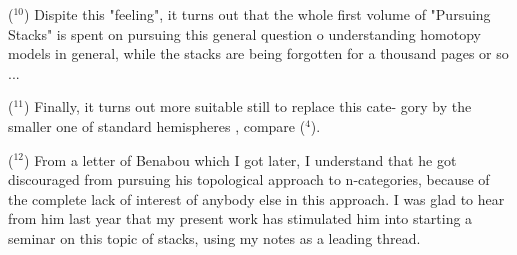 ($^{10}$)   Dispite this "feeling",  it turns out that the whole first volume
of "Pursuing Stacks" is spent on pursuing this general question o
understanding homotopy models in general,   while the stacks
are being forgotten  for a thousand pages or so ...

($^{11}$)   Finally,  it turns out more suitable still to replace this cate-%
gory by the  smaller one of standard hemispheres \hand{$\bigcirc$},  compare ($^4$).

($^{12}$)   From a letter of Benabou which I got later,  I understand that he
got discouraged from pursuing his topological approach to n-categories,
because of the complete lack of interest of anybody else in this approach.
I was glad to hear from him last year that my present work has stimulated
him into starting a seminar on this topic of stacks,  using my notes as a
leading thread.

